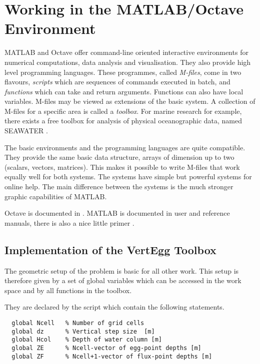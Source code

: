 %
\chapter{Working in the MATLAB/Octave Environment}

MATLAB and Octave offer command-line
oriented interactive environments for numerical computations, data
analysis and visualisation. They also provide high level programming
languages. These programmes, called \emph{M-files}, come
in two flavours, \emph{scripts} which are sequences of commands
executed in batch, and \emph{functions} which can take and return
arguments. Functions can also have local variables.  M-files may be
viewed as extensions of the basic system.  A collection of M-files for
a specific area is called a \emph{toolbox}.  For marine
research for example, there exists a free toolbox for analysis of
physical oceanographic data, named SEAWATER
\citep{morg94}.


The basic environments and the programming languages are quite
compatible. They provide the same basic data structure, arrays of
dimension up to two (scalars, vectors, matrices).  This makes it
possible to write M-files that work equally well for both systems. The
systems have simple but powerful systems for online help. 
The main difference between the systems is the much stronger graphic
capabilities of MATLAB.



Octave is documented in \citep{eato95}.  MATLAB is documented in user
and reference manuals, there is also a nice little primer \citep{sigm94}.

\section{Implementation of the VertEgg Toolbox}

The geometric setup of the problem is basic for all other
work. This setup is therefore given by a set of global variables
which can be accessed in the work space and by all functions in the toolbox.

They are declared by the script  which
contain the following statements.
\begin{verbatim}
  global Ncell   % Number of grid cells 
  global dz      % Vertical step size  [m] 
  global Hcol    % Depth of water column [m]
  global ZE      % Ncell-vector of egg-point depths [m]
  global ZF      % Ncell+1-vector of flux-point depths [m] 
\end{verbatim}



